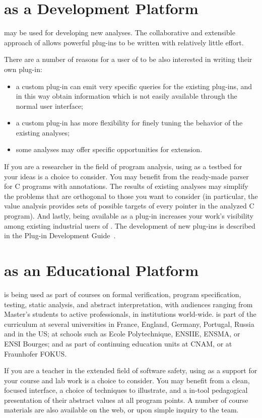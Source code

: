 \section{\FramaC as a Development Platform}

\FramaC may be used for developing new analyses.
The collaborative and extensible approach of \FramaC allows powerful
plug-ins to be written with relatively little effort.

There are a number of reasons for a user of \FramaC to be also interested in
writing their own plug-in:
\begin{itemize}
\item a custom plug-in can emit very specific queries for the existing
  plug-ins, and in this way obtain information which is not easily available
  through the normal user interface;
\item a custom plug-in has more flexibility for finely tuning the behavior of the
  existing analyses;
\item some analyses may offer specific opportunities for extension.
\end{itemize}

If you are a researcher in the field of program analysis,
using \FramaC as a testbed for your ideas is a choice to consider.
You may benefit from the ready-made parser for C programs with \acsl
annotations. The results of existing analyses may simplify the problems
that are orthogonal to those you want to consider (in particular, the
value analysis provides sets of possible targets of every pointer
in the analyzed C program).
And lastly, being available as a \FramaC plug-in increases
your work's visibility among existing industrial users of \FramaC.
The development of new plug-ins is described in the
Plug-in Development Guide~\cite{plugin-dev-guide}.

\section{\FramaC as an Educational Platform}

\FramaC is being used as part of courses on formal verification,
program specification, testing, static analysis, and abstract interpretation,
with audiences ranging from Master's students to active professionals, in
institutions world-wide.  \FramaC is part of the curriculum at several
universities in France, England, Germany, Portugal, Russia and in the US; at
schools such as Ecole Polytechnique, ENSIIE, ENSMA, or ENSI Bourges; and as
part of continuing education units at CNAM, or at Fraunhofer FOKUS.

If you are a teacher in the extended field of software safety, using \FramaC as
a support for your course and lab work is a choice to consider. You may benefit
from a clean, focused interface, a choice of techniques to illustrate, and a
in-tool pedagogical presentation of their abstract values at all program
points. A number of course materials are also available on the web, or upon
simple inquiry to the \FramaC team.
